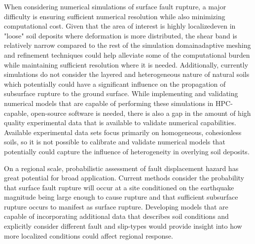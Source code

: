 
When considering numerical simulations of surface fault rupture, a major difficulty is ensuring sufficient numerical resolution while also minimizing computational cost. Given that the area of interest is highly localized\textemdash even in "loose" soil deposits where deformation is more distributed, the shear band is relatively narrow compared to the rest of the simulation domain\textemdash adaptive meshing and refinement techniques could help alleviate some of the computational burden while maintaining sufficient resolution where it is needed. Additionally, currently simulations do not consider the layered and heterogeneous nature of natural soils which potentially could have a significant influence on the propagation of subsurface rupture to the ground surface. While implementing and validating numerical models that are capable of performing these simulations in HPC-capable, open-source software is needed, there is also a gap in the amount of high quality experimental data that is available to validate numerical capabilities. Available experimental data sets focus primarily on homogeneous, cohesionless soils, so it is not possible to calibrate and validate numerical models that potentially could capture the influence of heterogeneity in overlying soil deposits.

On a regional scale, probabilistic assessment of fault displacement hazard has great potential for broad application. Current methods consider the probability that surface fault rupture will occur at a site conditioned on the earthquake magnitude being large enough to cause rupture and that sufficient subsurface rupture occurs to manifest as surface rupture. Developing models that are capable of incorporating additional data that describes soil conditions and explicitly consider different fault and slip-types would provide insight into how more localized conditions could affect regional response.



